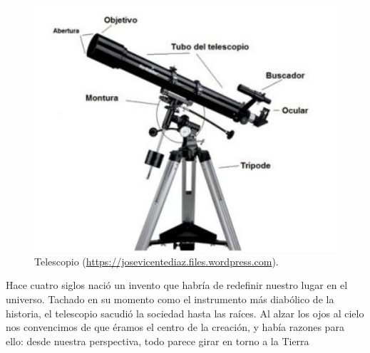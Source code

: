 \begin{figure}[!ht]
  \begin{center}
  \includegraphics[width=1\textwidth]{../images/telescopio.jpg}
  \caption{Telescopio (\url{https://josevicentediaz.files.wordpress.com}).}
  \label{fig:diag_scrum}
  \end{center}
\end{figure}

\bigskip
Hace cuatro siglos nació un invento que habría de redefinir nuestro lugar en el universo. Tachado en su momento como el instrumento más diabólico de la historia, el telescopio sacudió la sociedad hasta las raíces. Al alzar los ojos al cielo nos convencimos de que éramos el centro de la creación, y había razones para ello: desde nuestra perspectiva, todo parece girar en torno a la Tierra

